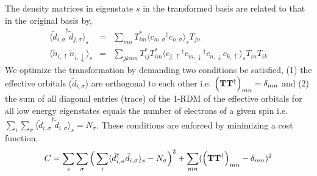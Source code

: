 The density matrices in eigenstate $s$ in the transformed basis are related to that in the original basis by,
\begin{subequations}
\begin{eqnarray}
	\langle {\tilde{d}_{i,\sigma}}^{\dagger} \tilde{d}_{j,\sigma} \rangle_{s} &=& \sum_{mn} T^{*}_{im} \langle {c_{m,\sigma}}^{\dagger} c_{n,\sigma} \rangle_{s} T_{jn} \label{eq:dmstransformations1} \\
	\langle \tilde{n}_{i,\uparrow} \tilde{n}_{i,\downarrow} \rangle_{s} &=& \sum_{jkmn} T^{*}_{ij} T^{*}_{im} \langle {c_{j,\uparrow}}^{\dagger} {c_{m,\downarrow}}^{\dagger} c_{n,\downarrow} c_{k,\uparrow} \rangle_{s} T_{in} T_{ik}
\label{eq:dmstransformations2}
\end{eqnarray}
\end{subequations}
We optimize the transformation by demanding two conditions be satisfied, (1) the effective orbitals ($\tilde{d}_{i,\sigma}$) 
are orthogonal to each other i.e. $\Big({\bf T} {\bf T}^{\dagger}\Big)_{mn} = \delta_{mn}$
and (2) the sum of all diagonal entries (trace) of the 1-RDM of the effective orbitals for all low energy eigenstates 
equals the number of electrons of a given spin i.e. $\sum_{i} \sum_{\sigma} \langle {\tilde{d}_{i,\sigma}}^{\dagger} \tilde{d}_{i,\sigma} \rangle_{s} = N_{\sigma}$. 
These conditions are enforced by minimizing a cost function,
\begin{equation}
C = \sum_{s} \sum_{\sigma} \Big( \sum_{i} \langle \tilde{d}_{i,\sigma}^{\dagger} \tilde{d}_{i,\sigma} \rangle_{s} - N_{\sigma} \Big)^{2} + \sum_{mn} ( \Big({\bf T} {\bf T}^{\dagger}\Big)_{mn} -\delta_{mn})^{2}
\label{eq:C}
\end{equation} 

